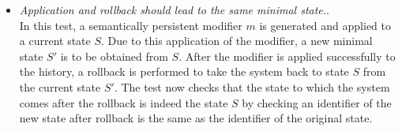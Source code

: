 \begin{enumerate}[\IEEEsetlabelwidth{Z}]
\begin{itemize}[]

\item \textit{Application and rollback should lead to the same minimal state.}.\\

In this test, a semantically persistent modifier $m$ is generated and applied to a current state $S$. Due to this application of the modifier, a new minimal state $S'$ is to be obtained from $S$. After the modifier is applied successfully to the history, a rollback is performed to take the system back to state $S$ from the current state $S'$. The test now checks that the state to which the system comes after the rollback is indeed the state $S$ by checking an identifier of the new state after rollback is the same as the identifier of the original state.\\


\end{itemize}
\end{enumerate}
